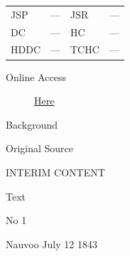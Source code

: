 				\begin{tabular}{p{0.5in}p{1in}p{0.5in}p{1in}}
				JSP	 	& ---		& JSR 		& --- \\
				DC	 	& ---		& HC 		& --- \\
				HDDC 	& ---		& TCHC 		& --- \\
				\end{tabular}
			
			\begin{description}
				\item[Online Access] \href{https://www.josephsmithpapers.org/paper-summary/revelation-12-july-1843-dc-132/1}{Here}
			\end{description}
			
			\begin{description}
				\item[Background]
			\end{description}
			
			
			\begin{description}
				\item[Original Source]
			\end{description}
			
				INTERIM CONTENT
			
			
			\begin{description}
				\item[Text]
			\end{description}
			
				No 1

				\begin{tightright}
					Nauvoo July 12 1843
				\end{tightright}

